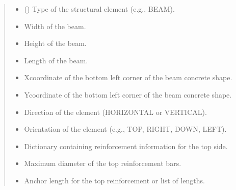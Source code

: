 \documentclass[a4paper,10pt,english]{sphinxmanual}
\begin{document}
\begin{fulllineitems}
\begin{quote}
\begin{description}
\begin{itemize}
\item {} 
\sphinxAtStartPar
{} () \textendash{} Type of the structural element (e.g., BEAM).

\end{itemize}

\begin{itemize}
\item {} 
\sphinxAtStartPar
{} \textendash{} Width of the beam.

\item {} 
\sphinxAtStartPar
{} \textendash{} Height of the beam.

\item {} 
\sphinxAtStartPar
{} \textendash{} Length of the beam.

\item {} 
\sphinxAtStartPar
{} \textendash{} X\sphinxhyphen{}coordinate of the bottom left corner of the beam concrete shape.

\item {} 
\sphinxAtStartPar
{} \textendash{} Y\sphinxhyphen{}coordinate of the bottom left corner of the beam concrete shape.

\item {} 
\sphinxAtStartPar
{} \textendash{} Direction of the element (HORIZONTAL or VERTICAL).

\item {} 
\sphinxAtStartPar
{} \textendash{} Orientation of the element (e.g., TOP, RIGHT, DOWN, LEFT).

\item {} 
\sphinxAtStartPar
{} \textendash{} Dictionary containing reinforcement information for the top side.

\item {} 
\sphinxAtStartPar
{} \textendash{} Maximum diameter of the top reinforcement bars.

\item {} 
\sphinxAtStartPar
{} \textendash{} Anchor length for the top reinforcement or list of lengths.


\end{itemize}
\end{description}
\end{quote}
\end{fulllineitems}
\end{document}
